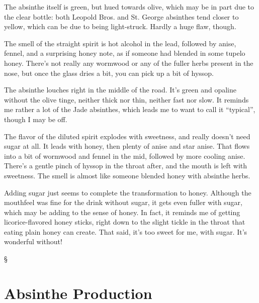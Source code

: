 \documentclass[12pt,letterpaper,oneside]{memoir}
\newcommand\secdiv{
  \begin{center}
    \S
  \end{center}
}
\begin{document}
  The absinthe itself is green, but hued towards olive, which may be in part due to the clear bottle: both Leopold Bros. and St. George absinthes tend closer to yellow, which can be due to being light-struck.  Hardly a huge flaw, though.

  The smell of the straight spirit is hot alcohol in the lead, followed by anise, fennel, and a surprising honey note, as if someone had blended in some tupelo honey.  There's not really any wormwood or any of the fuller herbs present in the nose, but once the glass dries a bit, you can pick up a bit of hyssop.

  The absinthe louches right in the middle of the road.  It's green and opaline without the olive tinge, neither thick nor thin, neither fast nor slow.  It reminds me rather a lot of the Jade absinthes, which leads me to want to call it ``typical'', though I may be off.

  The flavor of the diluted spirit explodes with sweetness, and really doesn't need sugar at all.  It leads with honey, then plenty of anise and star anise.  That flows into a bit of wormwood and fennel in the mid, followed by more cooling anise.  There's a gentle pinch of hyssop in the throat after, and the mouth is left with sweetness.  The smell is almost like someone blended honey with absinthe herbs.

  Adding sugar just seems to complete the transformation to honey.  Although the mouthfeel was fine for the drink without sugar, it gets even fuller with sugar, which may be adding to the sense of honey.  In fact, it reminds me of getting licorice-flavored honey sticks, right down to the slight tickle in the throat that eating plain honey can create.  That said, it's too sweet for me, with sugar.  It's wonderful without!

  \secdiv

  \newpage

  \section*{Absinthe Production}
\end{document}
